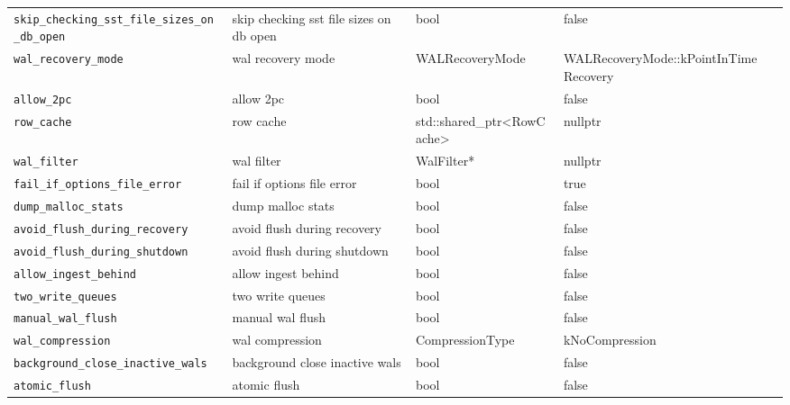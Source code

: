 {{\begin{longtable}{@{}p{3.4cm}p{5.0cm}p{3.6cm}p{2.5cm}p{2.6cm}@{}}
    \texttt{skip\_checking\_sst\_file\_sizes\_on\_db\_open}
    & skip checking sst file sizes on db open
    & bool
    & false
    & \\

    \texttt{wal\_recovery\_mode}
    & wal recovery mode
    & WALRecoveryMode
    & WALRecoveryMode::kPointInTimeRecovery
    & \\

    \texttt{allow\_2pc}
    & allow 2pc
    & bool
    & false
    & \\

    \texttt{row\_cache}
    & row cache
    & std::shared\_ptr\textless{}RowCache\textgreater{}
    & nullptr
    & \\

    \texttt{wal\_filter}
    & wal filter
    & WalFilter*
    & nullptr
    & \\

    \texttt{fail\_if\_options\_file\_error}
    & fail if options file error
    & bool
    & true
    & \\

    \texttt{dump\_malloc\_stats}
    & dump malloc stats
    & bool
    & false
    & \\

    \texttt{avoid\_flush\_during\_recovery}
    & avoid flush during recovery
    & bool
    & false
    & \\

    \texttt{avoid\_flush\_during\_shutdown}
    & avoid flush during shutdown
    & bool
    & false
    & \\

    \texttt{allow\_ingest\_behind}
    & allow ingest behind
    & bool
    & false
    & \\

    \texttt{two\_write\_queues}
    & two write queues
    & bool
    & false
    & \\

    \texttt{manual\_wal\_flush}
    & manual wal flush
    & bool
    & false
    & \\

    \texttt{wal\_compression}
    & wal compression
    & CompressionType
    & kNoCompression
    & \\

    \texttt{background\_close\_inactive\_wals}
    & background close inactive wals
    & bool
    & false
    & \\

    \texttt{atomic\_flush}
    & atomic flush
    & bool
    & false
    & \\


\end{longtable}}}
